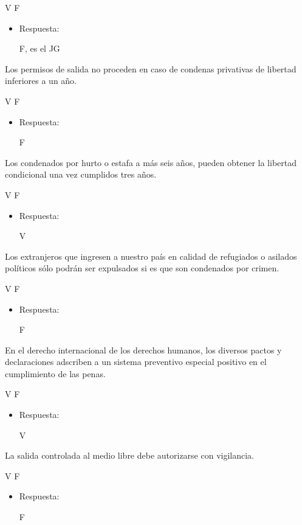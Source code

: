 \documentclass[letterpaper, 11pt]{article}
\begin{document}
V F

\begin{itemize}
\item Respuesta:

F, es el JG
\end{itemize}


Los permisos de salida no proceden en caso de condenas privativas de
libertad inferiores a un año.


V F

\begin{itemize}
\item Respuesta:

F
\end{itemize}


Los condenados por hurto o estafa a más seis años, pueden obtener la
libertad condicional una vez cumplidos tres años.


V F

\begin{itemize}
\item Respuesta:

V
\end{itemize}

Los extranjeros que ingresen a nuestro país en calidad de refugiados o
asilados políticos sólo podrán ser expulsados si es que son condenados
por crimen.


V F

\begin{itemize}
\item Respuesta:

F
\end{itemize}


En el derecho internacional de los derechos humanos, los diversos
pactos y declaraciones adscriben a un sistema preventivo especial
positivo en el cumplimiento de las penas.


V F

\begin{itemize}
\item Respuesta:

V
\end{itemize}

La salida controlada al medio libre debe autorizarse con vigilancia.


V F

\begin{itemize}
\item Respuesta:

F
\end{itemize}
\end{document}

